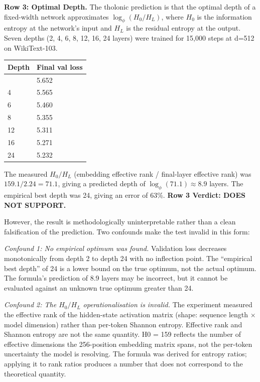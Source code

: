 \documentclass[
  11pt,
  letterpaper,
]{article}
\begin{document}
\textbf{Row 3: Optimal Depth.} The tholonic prediction is that the
optimal depth of a fixed-width network approximates
\(\log_\phi(H_0/H_L)\), where \(H_0\) is the information entropy at the
network's input and \(H_L\) is the residual entropy at the output. Seven
depths (2, 4, 6, 8, 12, 16, 24 layers) were trained for 15,000 steps at
d=512 on WikiText-103.

\begin{longtable}[]{@{}ll@{}}
\toprule\noalign{}
Depth & Final val loss \\
\midrule\noalign{}
\endhead
\bottomrule\noalign{}
\endlastfoot
2 & 5.652 \\
4 & 5.565 \\
6 & 5.460 \\
8 & 5.355 \\
12 & 5.311 \\
16 & 5.271 \\
24 & 5.232 \\
\end{longtable}

The measured \(H_0/H_L\) (embedding effective rank / final-layer
effective rank) was \(159.1 / 2.24 = 71.1\), giving a predicted depth of
\(\log_\phi(71.1) \approx 8.9\) layers. The empirical best depth was 24,
giving an error of 63\%. \textbf{Row 3 Verdict: DOES NOT SUPPORT.}

However, the result is methodologically uninterpretable rather than a
clean falsification of the prediction. Two confounds make the test
invalid in this form:

\emph{Confound 1: No empirical optimum was found.} Validation loss
decreases monotonically from depth 2 to depth 24 with no inflection
point. The ``empirical best depth'' of 24 is a lower bound on the true
optimum, not the actual optimum. The formula's prediction of 8.9 layers
may be incorrect, but it cannot be evaluated against an unknown true
optimum greater than 24.

\emph{Confound 2: The \(H_0/H_L\) operationalisation is invalid.} The
experiment measured the effective rank of the hidden-state activation
matrix (shape: sequence length × model dimension) rather than per-token
Shannon entropy. Effective rank and Shannon entropy are not the same
quantity. H0 = 159 reflects the number of effective dimensions the
256-position embedding matrix spans, not the per-token uncertainty the
model is resolving. The formula was derived for entropy ratios; applying
it to rank ratios produces a number that does not correspond to the
theoretical quantity.
\end{document}
